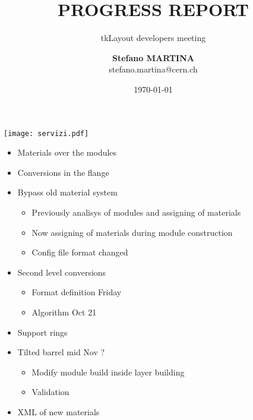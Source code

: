 \documentclass[pdftex, 11pt]{beamer}
\title[Progress report]{\textbf{PROGRESS REPORT}}
\subtitle{tkLayout developers meeting}
\institute[CERN]{
  European Organization for Nuclear Research\\[0.5cm]
  \texttt{[image: img/LogoBadge.pdf]}\\
}
\author[Stefano Martina]{
  \textbf{Stefano MARTINA}\\
  {\small stefano.martina@cern.ch}
}
\date[\today]{\flushright \today}
\begin{document}
\begin{frame}
  \titlepage
\end{frame}

\begin{frame}
  \begin{center}
    \texttt{[image: servizi.pdf]}
  \end{center}

  \begin{itemize}
  \item Materials over the modules
  \item Conversions in the flange
  \item Bypass old material system
    \begin{itemize}
    \item Previously analisys of modules and assigning of materials
    \item Now assigning of materials during module construction
    \item Config file format changed
    \end{itemize}
  \end{itemize}
\end{frame}

\begin{frame}
  \begin{itemize}
  \item Second level conversions
    \begin{itemize}
    \item Format definition \alert{Friday}
    \item Algorithm \alert{Oct 21}
    \end{itemize}
  \item Support rings
  \item Tilted barrel \alert{mid Nov ?}
    \begin{itemize}
    \item Modify module build inside layer building
    \item Validation
    \end{itemize}
  \item XML of new materials
  \end{itemize}
\end{frame}
\end{document}
